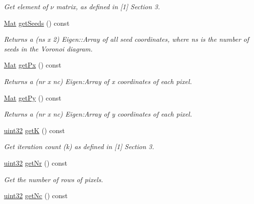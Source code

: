 \begin{DoxyCompactItemize}
\begin{DoxyCompactList}\small\item\em Get element of $\nu$ matrix, as defined in \mbox{[}1\mbox{]} Section 3. \end{DoxyCompactList}\item 
\mbox{\hyperlink{typedefs_8h_a9fa28c1f74e909474857584f5c7b0088}{Mat}} \mbox{\hyperlink{classvd_a82f353c594c3c6b24f6077398f059d3a}{get\+Seeds}} () const
\begin{DoxyCompactList}\small\item\em Returns a (ns x 2) Eigen\+::\+Array of all seed coordinates, where ns is the number of seeds in the Voronoi diagram. \end{DoxyCompactList}\item 
\mbox{\hyperlink{typedefs_8h_a9fa28c1f74e909474857584f5c7b0088}{Mat}} \mbox{\hyperlink{classvd_aeba6d318016c8f8b9537ce4c0314f8cd}{get\+Px}} () const
\begin{DoxyCompactList}\small\item\em Returns a (nr x nc) Eigen\+:Array of x coordinates of each pixel. \end{DoxyCompactList}\item 
\mbox{\hyperlink{typedefs_8h_a9fa28c1f74e909474857584f5c7b0088}{Mat}} \mbox{\hyperlink{classvd_a9738711704b1d03cdbe027b1976cb0c6}{get\+Py}} () const
\begin{DoxyCompactList}\small\item\em Returns a (nr x nc) Eigen\+:Array of y coordinates of each pixel. \end{DoxyCompactList}\item 
\mbox{\hyperlink{typedefs_8h_a8ad23e2333787a214e20a58a284a5a60}{uint32}} \mbox{\hyperlink{classvd_ae145808dbbebfc984811eb48a6a57585}{getK}} () const
\begin{DoxyCompactList}\small\item\em Get iteration count (k) as defined in \mbox{[}1\mbox{]} Section 3. \end{DoxyCompactList}\item 
\mbox{\hyperlink{typedefs_8h_a8ad23e2333787a214e20a58a284a5a60}{uint32}} \mbox{\hyperlink{classvd_afda5d6b3eb04899e1b31c5ee3a3af527}{get\+Nr}} () const
\begin{DoxyCompactList}\small\item\em Get the number of rows of pixels. \end{DoxyCompactList}\item 
\mbox{\hyperlink{typedefs_8h_a8ad23e2333787a214e20a58a284a5a60}{uint32}} \mbox{\hyperlink{classvd_a555fdcee74959a18003dd992a4c57cef}{get\+Nc}} () const

\end{DoxyCompactItemize}
